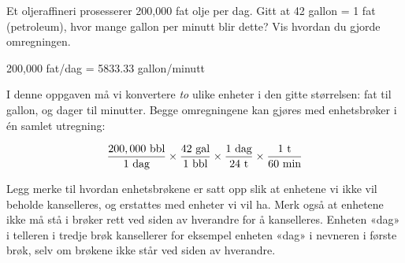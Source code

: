 
Et oljeraffineri prosesserer 200,000 fat olje per dag. Gitt at 42 gallon = 1 fat (petroleum), hvor mange gallon per minutt blir dette? Vis hvordan du gjorde omregningen.







200,000 fat/dag = 5833.33 gallon/minutt

\vskip 10pt

I denne oppgaven må vi konvertere {\it to} ulike enheter i den gitte størrelsen: fat til gallon, og dager til minutter. Begge omregningene kan gjøres med enhetsbrøker i én samlet utregning:

$${200,000 \hbox{ bbl} \over 1 \hbox{ dag}} \times {42 \hbox{ gal} \over 1 \hbox{ bbl}} \times {1 \hbox{ dag} \over 24 \hbox{ t}} \times {1 \hbox{ t} \over 60 \hbox{ min}}$$

Legg merke til hvordan enhetsbrøkene er satt opp slik at enhetene vi ikke vil beholde kanselleres, og erstattes med enheter vi vil ha. Merk også at enhetene ikke må stå i brøker rett ved siden av hverandre for å kanselleres. Enheten «dag» i telleren i tredje brøk kansellerer for eksempel enheten «dag» i nevneren i første brøk, selv om brøkene ikke står ved siden av hverandre.









